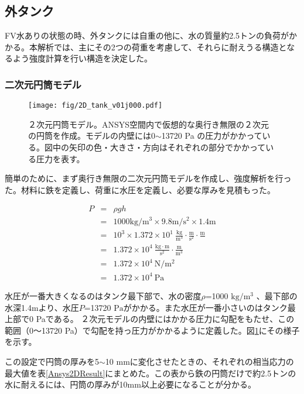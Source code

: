 \documentclass[11pt]{ltjsreport}
\newcommand{\figref}[1]{図\ref{#1}}
\newcommand{\tabref}[1]{表\ref{#1}}
\begin{document}
\subsection{外タンク}
FV水ありの状態の時、外タンクには自重の他に、水の質量約2.5トンの負荷がかかる。本解析では、主にその2つの荷重を考慮して、それらに耐えうる構造となるよう強度計算を行い構造を決定した。

\subsubsection{二次元円筒モデル}

\begin{figure}[htbp]
\centering
\texttt{[image: fig/2D\_tank\_v01j000.pdf]}
\caption[２次元円筒モデル]{２次元円筒モデル。ANSYS空間内で仮想的な奥行き無限の２次元の円筒を作成。モデルの内壁には0$\sim$13720 Pa の圧力がかかっている。図中の矢印の色・大きさ・方向はそれぞれの部分でかかっている圧力を表す。}
\label{Ansys2D}
\end{figure}

簡単のために、まず奥行き無限の二次元円筒モデルを作成し、強度解析を行った。材料に鉄を定義し、荷重に水圧を定義し、必要な厚みを見積もった。

\begin{eqnarray}
P & = & \rho g h\\
& = & 1000 \mathrm{kg/m^{3}} \times 9.8 \mathrm{m/s^{2}} \times 1.4 \mathrm{m}\\
& = & 10^{3} \times 1.372 \times 10^{1}\ \mathrm{\frac{kg}{m^{3}} \cdot \frac{m}{s^{2}} \cdot \frac{m}{}}\\
& = & 1.372 \times 10^{4} \ \mathrm{\frac{kg\cdot m}{s^{2}} \cdot \frac{m}{m^{3}}}\\
& = & 1.372 \times 10^{4} \ \mathrm{N/m^{2}}\\
& = & 1.372 \times 10^{4} \ \mathrm{Pa}
\end{eqnarray}
\fi




水圧が一番大きくなるのはタンク最下部で、水の密度$\rho$=1000 $\mathrm{kg/m^{3}}$ 、最下部の水深1.4mより、水圧$P$=13720 $\mathrm{Pa}$がかかる。また水圧が一番小さいのはタンク最上部で0 Paである。
２次元モデルの内壁にはかかる圧力に勾配をもたせ、この範囲（0〜13720 Pa）で勾配を持っ圧力がかかるように定義した。\figref{Ansys2D}にその様子を示す。

この設定で円筒の厚みを5$\sim$10 mmに変化させたときの、それぞれの相当応力の最大値を\tabref{Ansys2DResult}にまとめた。この表から鉄の円筒だけで約2.5トンの水に耐えるには、円筒の厚みが10mm以上必要になることが分かる。
\end{document}
